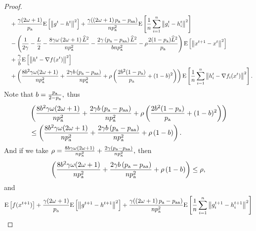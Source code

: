 \documentclass{article}
\newcommand*{\probavailable}{\ensuremath{p_{\textnormal{a}}}}
\newcommand*{\probpairaa}{\ensuremath{p_{\textnormal{aa}}}}
\begin{document}
\begin{proof}
\begin{align*}
      &\quad + \frac{\gamma (2 \omega + 1)}{\probavailable} \Exp{\norm{g^{t} - h^{t}}^2} + \frac{\gamma (\left(2 \omega + 1\right)\probavailable - \probpairaa)}{n \probavailable^2} \Exp{\frac{1}{n}\sum_{i=1}^n\norm{g^{t}_i - h^{t}_i}^2} \\
      &\quad - \left(\frac{1}{2\gamma} - \frac{L}{2} - \frac{8 \gamma \omega \left(2 \omega + 1\right) \widehat{L}^2}{n \probavailable^2} - \frac{2\gamma \left(\probavailable - \probpairaa\right)\widehat{L}^2}{b n \probavailable^2} - \rho \frac{2(1 - \probavailable) \widehat{L}^2}{\probavailable} \right) \Exp{\norm{x^{t+1} - x^t}^2} \\
      &\quad + \frac{\gamma}{b} \Exp{\norm{h^{t} - \nabla f(x^{t})}^2} \\
      &\quad + \left(\frac{8 b^2 \gamma \omega (2 \omega + 1)}{n \probavailable^2} + \frac{2 \gamma b \left(\probavailable - \probpairaa\right)}{n \probavailable^2} + \rho \left(\frac{2 b^2 (1 - \probavailable)}{\probavailable} + (1 - b)^2\right) \right)\Exp{\frac{1}{n}\sum_{i=1}^n\norm{h^{t}_i - \nabla f_i(x^{t})}^2}.
    \end{align*}
    Note that $b = \frac{\probavailable}{2 - \probavailable},$ thus
    \begin{align*}
      &\left(\frac{8 b^2 \gamma \omega (2 \omega + 1)}{n \probavailable^2} + \frac{2 \gamma b \left(\probavailable - \probpairaa\right)}{n \probavailable^2} + \rho \left(\frac{2 b^2 (1 - \probavailable)}{\probavailable} + (1 - b)^2\right) \right) \\
      &\leq \left(\frac{8 b^2 \gamma \omega (2 \omega + 1)}{n \probavailable^2} + \frac{2 \gamma b \left(\probavailable - \probpairaa\right)}{n \probavailable^2} + \rho \left(1 - b\right) \right).
    \end{align*}
    And if we take $\rho = \frac{8 b \gamma \omega (2 \omega + 1)}{n \probavailable^2} + \frac{2 \gamma \left(\probavailable - \probpairaa\right)}{n \probavailable^2},$ then
    \begin{align*}
      \left(\frac{8 b^2 \gamma \omega (2 \omega + 1)}{n \probavailable^2} + \frac{2 \gamma b \left(\probavailable - \probpairaa\right)}{n \probavailable^2} + \rho \left(1 - b\right) \right) \leq \rho,
    \end{align*}
    and 
    \begin{align*}
      &\Exp{f(x^{t + 1})} + \frac{\gamma (2 \omega + 1)}{\probavailable} \Exp{\norm{g^{t+1} - h^{t+1}}^2} + \frac{\gamma (\left(2 \omega + 1\right)\probavailable - \probpairaa)}{n \probavailable^2} \Exp{\frac{1}{n}\sum_{i=1}^n\norm{g^{t+1}_i - h^{t+1}_i}^2}\\

\end{align*}
\end{proof}
\end{document}
